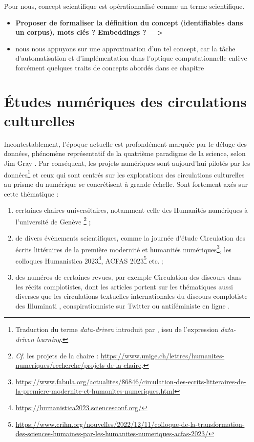 Pour nous, concept scientifique est opérationnalisé comme un terme scientifique.

\begin{itemize}
\item \textbf{Proposer de formaliser la définition du concept (identifiables dans un corpus), mots clés ? Embeddings ? —>} 
\item nous nous appuyons sur une approximation d'un tel concept, car la tâche d'automatisation et d'implémentation dans l'optique computationnelle enlève forcément quelques traits de concepts abordés dans ce chapitre
\end{itemize}





\section{Études numériques des circulations culturelles}
\label{circulations}
Incontestablement, l'époque actuelle est profondément marquée par le \og{}déluge des données\fg{}, phénomène représentatif de la quatrième paradigme de la science, selon Jim Gray \citep[p.~30]{hey2009jim}. Par conséquent, les projets numériques sont aujourd'hui \og{}pilotés par les données\fg{}\footnote{Traduction du terme \textit{data-driven} introduit par \citet{Johns1991ShouldYB}, issu de l'expression \textit{data-driven learning}.} et ceux qui sont centrés sur les explorations des circulations culturelles au prisme du numérique se concrétisent à grande échelle.
Sont fortement axés sur cette thématique :
\begin{enumerate}
\item certaines chaires universitaires, notamment celle des Humanités numériques à l'université de Genève \citep{joyeux2022circulations}\footnote{\textit{Cf.} les projets de la chaire : \url{https://www.unige.ch/lettres/humanites-numeriques/recherche/projets-de-la-chaire}.} ;
\item de divers évènements scientifiques, comme la journée d'étude \og{}Circulation des écrits littéraires de la première modernité et humanités numériques\fg{}\footnote{\url{https://www.fabula.org/actualites/86846/circulation-des-ecrits-litteraires-de-la-premiere-modernite-et-humanites-numeriques.html}}, les colloques Humanistica 2023\footnote{\url{https://humanistica2023.sciencesconf.org/}}, \textsc{ACFAS} 2023\footnote{\url{https://www.crihn.org/nouvelles/2022/12/11/colloque-de-la-transformation-des-sciences-humaines-par-les-humanites-numeriques-acfas-2023/}} etc. ;
\item des numéros de certaines revues, par exemple \og{}Circulation des discours dans les récits complotistes\fg{}, dont les articles portent sur les thématiques aussi diverses que les circulations textuelles internationales du discours complotiste des \og Illuminati \fg{}  \citep{chaudet2022illuminati}, \og conspirationniste \fg{} sur Twitter \citep{giry2022etudier} ou antiféministe en ligne \citep{morin2022discours}. 
\end{enumerate}

